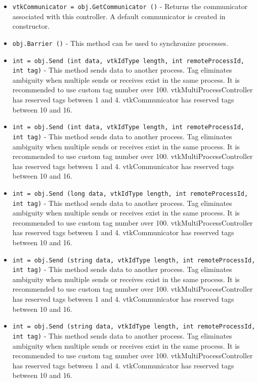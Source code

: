 \begin{itemize}
\item  \verb|vtkCommunicator = obj.GetCommunicator ()| -  Returns the communicator associated with this controller.
 A default communicator is created in constructor.

\item  \verb|obj.Barrier ()| -  This method can be used to synchronize processes.

\item  \verb|int = obj.Send (int data, vtkIdType length, int remoteProcessId, int tag)| -  This method sends data to another process.  Tag eliminates ambiguity
 when multiple sends or receives exist in the same process.
 It is recommended to use custom tag number over 100.
 vtkMultiProcessController has reserved tags between 1 and 4.
 vtkCommunicator has reserved tags between 10 and 16.

\item  \verb|int = obj.Send (int data, vtkIdType length, int remoteProcessId, int tag)| -  This method sends data to another process.  Tag eliminates ambiguity
 when multiple sends or receives exist in the same process.
 It is recommended to use custom tag number over 100.
 vtkMultiProcessController has reserved tags between 1 and 4.
 vtkCommunicator has reserved tags between 10 and 16.

\item  \verb|int = obj.Send (long data, vtkIdType length, int remoteProcessId, int tag)| -  This method sends data to another process.  Tag eliminates ambiguity
 when multiple sends or receives exist in the same process.
 It is recommended to use custom tag number over 100.
 vtkMultiProcessController has reserved tags between 1 and 4.
 vtkCommunicator has reserved tags between 10 and 16.

\item  \verb|int = obj.Send (string data, vtkIdType length, int remoteProcessId, int tag)| -  This method sends data to another process.  Tag eliminates ambiguity
 when multiple sends or receives exist in the same process.
 It is recommended to use custom tag number over 100.
 vtkMultiProcessController has reserved tags between 1 and 4.
 vtkCommunicator has reserved tags between 10 and 16.

\item  \verb|int = obj.Send (string data, vtkIdType length, int remoteProcessId, int tag)| -  This method sends data to another process.  Tag eliminates ambiguity
 when multiple sends or receives exist in the same process.
 It is recommended to use custom tag number over 100.
 vtkMultiProcessController has reserved tags between 1 and 4.
 vtkCommunicator has reserved tags between 10 and 16.


\end{itemize}
